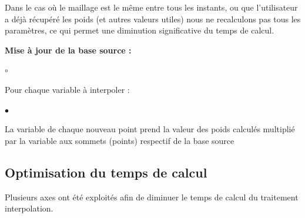 \vspace{0.5cm}

\noindent Dans le cas où le maillage est le même entre tous les instants, ou que l'utilisateur a déjà récupéré les poids (et autres valeurs utiles) nous ne recalculons pas tous les paramètres, ce qui permet une diminution significative du temps de calcul.

\vspace{0.5cm}

\textbf{Mise à jour de la base source :}
\begin{list}{$\circ$}{\leftmargin=0.5cm  \itemsep=0cm}
    \item Pour chaque variable à interpoler :
    \begin{list}{$\bullet$}{\leftmargin=0.5cm  \itemsep=0cm}
        \item La variable de chaque nouveau point prend la valeur des poids calculés multiplié par la variable aux sommets (points) respectif de la base source
    \end{list}
\end{list}




\subsection{Optimisation du temps de calcul}

Plusieurs axes ont été exploités afin de diminuer le temps de calcul du traitement interpolation.

